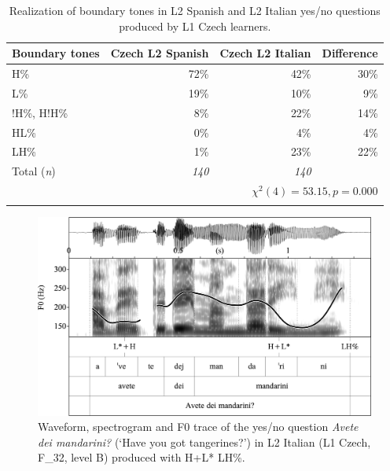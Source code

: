 \begin{table}
\begin{tabularx}{\textwidth}{Qrrr}

\lsptoprule

{Boundary tones} & {Czech L2 Spanish} & {Czech L2 Italian} & {Difference}\\
\midrule
H\% &  72\% &  42\% &  30\%\\
L\% &  19\% &  10\% &  9\%\\
!H\%, H!H\% &  8\% &  22\% &  14\%\\
HL\% &  0\% & 4\% &  4\%\\
LH\% &  1\% &  23\% &  22\%\\
\midrule
Total (\textit{n}) & {\itshape 140} & {\itshape 140} &  \\
\\
\lspbottomrule
\end{tabularx}

\caption{Realization of boundary tones in L2 Spanish and L2 Italian yes/no questions produced by L1 Czech learners.}
\label{tab:4.22}
\end{table}

\begin{figure}


\includegraphics[width=\textwidth]{figures/Figure_4.83.png}


\caption{Waveform, spectrogram and F0 trace of the yes/no question \textit{Avete dei mandarini?} (‘Have you got tangerines?’) in L2 Italian (L1 Czech, F\_32, level B) produced with H+L* LH\%.}
\label{fig:4.83}
\end{figure}


